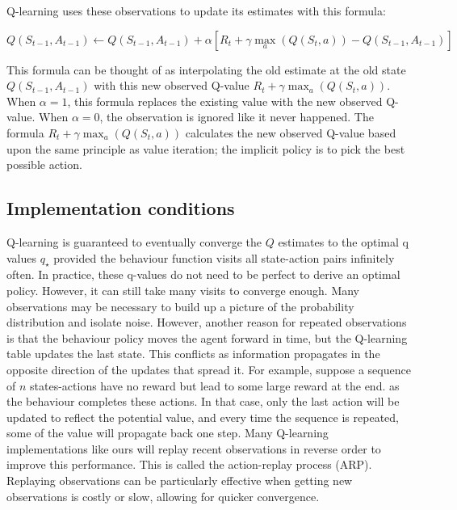 \documentclass[]{final_report}
\begin{document}
Q-learning uses these observations to update its estimates with this formula:

\begin{equation}
  Q(S_{t-1}, A_{t-1}) \leftarrow Q(S_{t-1}, A_{t-1}) +  \alpha [R_t + \gamma \max_a(Q(S_t,a)) - Q(S_{t-1}, A_{t-1})]
  \label{eqn:q-learning-update-formula}
\end{equation}


This formula can be thought of as interpolating the old estimate at the old state $Q(S_{t-1}, A_{t-1})$ with this new observed Q-value $R_t + \gamma \max_a(Q(S_t, a))$. When $\alpha = 1$, this formula replaces the existing value with the new observed Q-value.  When $\alpha = 0$, the observation is ignored like it never happened. The formula $R_t + \gamma \max_a(Q(S_t, a))$ calculates the new observed Q-value based upon the same principle as value iteration; the implicit policy is to pick the best possible action. 

\subsection{Implementation conditions}\label{sect:impl-conditions}

Q-learning is guaranteed to eventually converge the $Q$ estimates to the optimal q values $q_\star$ provided the behaviour function visits all state-action pairs infinitely often. In practice, these q-values do not need to be perfect to derive an optimal policy. However, it can still take many visits to converge enough. Many observations may be necessary to build up a picture of the probability distribution and isolate noise. However, another reason for repeated observations is that the behaviour policy moves the agent forward in time, but the Q-learning table updates the last state. This conflicts as information propagates in the opposite direction of the updates that spread it. For example, suppose a sequence of $n$ states-actions have no reward but lead to some large reward at the end. as the behaviour completes these actions. In that case, only the last action will be updated to reflect the potential value, and every time the sequence is repeated, some of the value will propagate back one step. Many Q-learning implementations like ours will replay recent observations in reverse order to improve this performance. This is called the action-replay process (ARP). Replaying observations can be particularly effective when getting new observations is costly or slow, allowing for quicker convergence.
\end{document}
